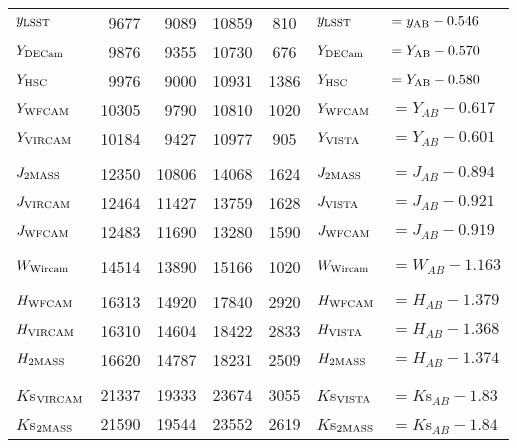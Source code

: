 \documentclass[usenatbib]{mnras}
\begin{document}
\begin{table*}
\begin{center}
\begin{tabular}{l r r r  c l l}
      $y_{\rm LSST}$      &       9677   &	 9089    &    10859  &     810         &  $y_{\rm LSST}  $      &$    = y_{\rm AB} - 0.546 $ \\
      $Y_{\rm DECam}$   &      9876   &	  9355    &      10730   &    676      &  $Y_{\rm DECam}  $   &$  =Y_{\rm AB} - 0.570 $ \\
      $Y_{\rm HSC}$       &      9976   &    9000    & 	10931  &   1386    &  $Y_{\rm HSC}  $   &$  =Y_{\rm AB} - 0.580 $ \\
      $Y_{\rm WFCAM}$    &   10305    &   9790      &   10810   &   1020     & $Y_{\rm WFCAM}$     &$ =  Y_{AB}  - 0.617$           \\
      $Y_{\rm VIRCAM}$     &    10184    &   9427      &   10977   &    905        & $Y_{\rm VISTA} $     &$ = Y_{AB}  - 0.601 $          \\
      &&&&&&\\
      $J_{\rm 2MASS}$       &   12350   &       10806  & 	14068  &  1624       &  $J_{\rm 2MASS}  $     & $= J_{AB}    - 0.894  $         \\
      $J_{\rm VIRCAM} $     &   12464   &      11427   &    13759   &  1628     &  $J_{\rm VISTA}  $     & $= J_{AB}    - 0.921  $         \\
      $J_{\rm WFCAM} $    &    12483   &     11690  &    13280   &   1590      & $J_{\rm WFCAM}$     & $= J_{AB}    - 0.919 $          \\
      &&&&&&\\
      $W_{\rm Wircam}$   &    14514    &    13890   &    15166   &   1020    & $W_{\rm Wircam} $    & $= W_{AB}  -  1.163$           \\
      &&&&&&\\
      $H_{\rm WFCAM}$    &    16313     &    14920  &    17840   &   2920    & $H_{\rm WFCAM} $   & $= H_{AB}  - 1.379$          \\
      $H_{\rm VIRCAM}$      &    16310    &    14604   &    18422   &   2833     & $H_{\rm VISTA}$      & $= H_{AB}  - 1.368 $        \\
      $H_{\rm 2MASS}$      & 16620        & 	14787  &   18231   & 2509      & $H_{\rm 2MASS}$      & $= H_{AB}  - 1.374 $        \\
      &&&&&&\\
      $K$s$_{\rm VIRCAM}$     &    21337    &    19333  &    23674   &   3055     & $K$s$_{\rm VISTA}$      & $ = K$s$_{AB} - 1.83  $          \\ 
      $K$s$_{\rm 2MASS}$     &   21590    & 	19544  &   23552        &   2619      & $K$s$_{\rm 2MASS}$      & $ = K$s$_{AB} -  1.84  $          \\ 

\end{tabular}
\end{center}
\end{table*}
\end{document}
